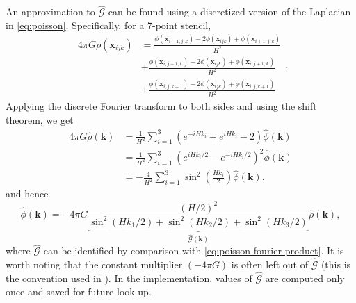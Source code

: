 An approximation to $\hat{\mathcal{G}}$ can be found using a discretized version of the Laplacian in \autoref{eq:poisson}.
Specifically, for a 7-point stencil,
\begin{equation*}
    \begin{split}
        4\pi G\rho(\mathbf{x}_{ijk})
         & =\frac{\phi(\mathbf{x}_{i-1,j,k}) - 2\phi(\mathbf{x}_{ijk})+\phi(\mathbf{x}_{i+1,j,k})}{H^2}   \\
         & + \frac{\phi(\mathbf{x}_{i,j-1,k}) - 2\phi(\mathbf{x}_{ijk})+\phi(\mathbf{x}_{i,j+1,k})}{H^2}  \\
         & + \frac{\phi(\mathbf{x}_{i,j,k-1}) - 2\phi(\mathbf{x}_{ijk})+\phi(\mathbf{x}_{i,j,k+1})}{H^2}.
    \end{split}.
\end{equation*}
Applying the discrete Fourier transform to both sides and using the shift theorem, we get
\begin{align*}
    4\pi G \hat{\rho}(\mathbf{k})
     & = \frac{1}{H^2}\sum_{i=1}^{3}\left( e^{-iHk_i} + e^{iHk_i}-2 \right)\hat{\phi}(\mathbf{k})       \\
     & = \frac{1}{H^2} \sum_{i=1}^{3}\left( e^{iHk_i/2} - e^{-iHk_i/2} \right)^2 \hat{\phi}(\mathbf{k}) \\
     & = -\frac{4}{H^2}\sum_{i=1}^{3}\sin^2\left(\frac{Hk_i}{2}\right)\hat{\phi}(\mathbf{k}).
\end{align*}
and hence
\begin{equation}\label{eq:dft-transformed-phi}
    \hat{\phi}(\mathbf{k}) = -4\pi G\underbrace{\frac{(H/2)^2}{\sin^2(Hk_1/2) + \sin^2(Hk_2/2) + \sin^2 (Hk_3/2)}}_{\hat{\mathcal{G}}(\mathbf{k})} \hat{\rho}(\mathbf{k}),
\end{equation}
where $\hat{\mathcal{G}}$ can be identified by comparison with \autoref{eq:poisson-fourier-product}.
It is worth noting that the constant multiplier $(-4\pi G)$ is often left out of $\hat{\mathcal{G}}$ (this is the convention used in \cite{Hockney1988}).
In the implementation, values of $\hat{\mathcal{G}}$ are computed only once and saved for future look-up.

